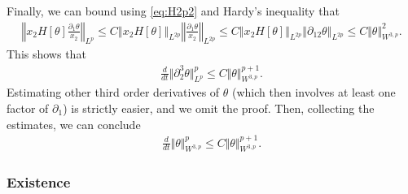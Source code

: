 \documentclass[10pt]{amsart}
\theoremstyle{definition}
\theoremstyle{remark}
\numberwithin{equation}{section}
\newcommand{\nrm}[1]{\Vert#1\Vert}
\newcommand{\rd}{\partial}
\newcommand{\0}{\emptyset}
\newcommand{\tht}{\theta}
\begin{document}
\begin{equation*}
		\end{equation*} Finally, we can bound using \eqref{eq:H2p2} and Hardy's inequality that \begin{equation*}
			\begin{split}
				\left\Vert x_{2}H[\tht] \frac{\rd_{1}\tht}{x_{2}} \right\Vert_{L^p} \le C\left\Vert x_{2}H[\tht] \right\Vert_{L^{2p}}\left\Vert \frac{\rd_{1}\tht}{x_{2}} \right\Vert_{L^{2p}} \le C\left\Vert x_{2}H[\tht] \right\Vert_{L^{2p}}\left\Vert  {\rd_{12}\tht}  \right\Vert_{L^{2p}} \le C\nrm{\tht}_{W^{3,p}}^{2}.
			\end{split}
		\end{equation*}This shows that \begin{equation*}
			\begin{split}
				\frac{d}{dt} \nrm{\rd_{2}^{3} \tht}_{L^{p}}^{p} \le C   \nrm{ \tht}_{W^{3,p}}^{p+1}.
			\end{split}
		\end{equation*} Estimating other third order derivatives of $\tht$ (which then involves at least one factor of $\rd_{1}$) is strictly easier, and we omit the proof. Then, collecting the estimates, we can conclude  \begin{equation*}
			\begin{split}
				\frac{d}{dt} \nrm{ \tht}_{W^{3,p}}^{p} \le C   \nrm{ \tht}_{W^{3,p}}^{p+1}.
			\end{split}
		\end{equation*} 

        \subsubsection{Existence}
        
        
        
\end{document}
